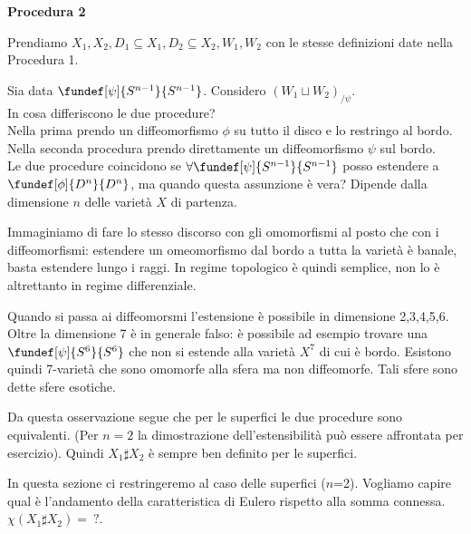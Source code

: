 \textbf{Procedura 2}

Prendiamo $X_1, X_2, D_1 \subseteq X_1, D_2 \subseteq X_2, W_1, W_2$ con le stesse definizioni date nella Procedura 1.

Sia data $\fundef[\psi]{S^{n-1}}{S^{n-1}}$. Considero $(W_1 \sqcup W_2)_{/\psi}$.
\\

In cosa differiscono le due procedure?\\
Nella prima prendo un diffeomorfismo $\phi$ su tutto il disco e lo restringo al bordo. Nella seconda procedura prendo direttamente un diffeomorfismo $\psi$ sul bordo.\\
Le due procedure coincidono se $\forall \fundef[\psi]{S^{n-1}}{S^{n-1}}$ posso estendere a $\fundef[\phi ]{D^n}{D^n}$, ma quando questa assunzione è vera? Dipende dalla dimensione $n$ delle varietà $X$ di partenza.

\begin{oss}
Immaginiamo di fare lo stesso discorso con gli omomorfismi al posto che con i diffeomorfismi: estendere un omeomorfismo dal bordo a tutta la varietà è banale, basta estendere lungo i raggi.
In regime topologico è quindi semplice, non lo è altrettanto in regime differenziale.

Quando si passa ai diffeomorsmi l'estensione è possibile in dimensione 2,3,4,5,6. Oltre la dimensione 7 è in generale falso: è possibile ad esempio trovare una $\fundef[\psi]{S^6}{S^6}$ che non si estende alla varietà $X^7$ di cui è bordo. Esistono quindi 7-varietà che sono omomorfe alla sfera ma non diffeomorfe. Tali sfere sono dette sfere esotiche.
\end{oss}

Da questa osservazione segue che per le superfici le due procedure sono equivalenti. (Per $n=2$ la dimostrazione dell'estensibilità può essere affrontata per esercizio). Quindi $X_1 \sharp X_2$ è sempre ben definito per le superfici.

\begin{epigraphs}	
\end{epigraphs}


In questa sezione ci restringeremo al caso delle superfici ($n$=2). Vogliamo capire qual è l'andamento della caratteristica di Eulero rispetto alla somma connessa. $\chi(X_1 \sharp X_2) =~?$.

